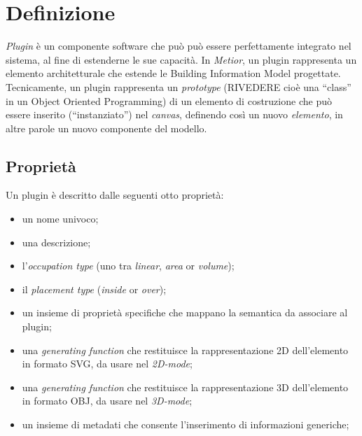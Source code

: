 \section{Definizione}
\label{sec:chapter_3_section_1}

\emph{Plugin} \`e un componente software che pu\`o può essere perfettamente integrato nel sistema, al fine di estenderne le sue capacit\`a.
In \emph{Metior}, un plugin rappresenta un elemento architetturale che estende le Building Information Model progettate.
Tecnicamente, un plugin rappresenta un \emph{prototype} (RIVEDERE cioè una ``class'' in un Object Oriented Programming) di un elemento di
costruzione che può essere inserito (``instanziato'') nel \emph{canvas}, definendo cos\`i un nuovo \emph{elemento},
in altre parole un nuovo componente del modello.
\newpage

\subsection*{Proprietà}
\noindent
Un plugin \`e descritto dalle seguenti otto propriet\`a:
\begin{itemize}
  \item un nome univoco;
  \item una descrizione;
  \item l'\emph{occupation type} (uno tra \emph{linear}, \emph{area} or \emph{volume});
  \item il \emph{placement type} (\emph{inside} or \emph{over});
  \item un insieme di proprietà specifiche che mappano la semantica da associare al plugin;
  \item  una \emph{generating function} che restituisce la rappresentazione 2D dell'elemento in formato SVG, da usare nel \emph{2D-mode};
  \item  una \emph{generating function} che restituisce la rappresentazione 3D dell'elemento in formato OBJ, da usare nel  \emph{3D-mode};
  \item un insieme di metadati che consente l'inserimento di informazioni generiche;
\end{itemize}
